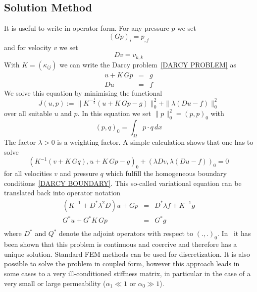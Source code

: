\subsection{Solution Method \label{DARCY SOLVE}}
It is useful to write  in operator form.
For any pressure $p$ we set
\begin{equation}
(Gp)_{i} =  p_{,j}
\end{equation}
and for velocity $v$ we set
\begin{equation}
Dv = v_{k,k}
\end{equation}
With $K=(\kappa_{ij})$ we can write the Darcy problem~\ref{DARCY PROBLEM} as
\begin{equation}
\begin{array}{rcl}
u + K \, Gp & = & g \\
Du & = & f 
\end{array}
\end{equation} 
We solve this equation by minimising the functional
\begin{equation}\label{DARCY COST}
J(u,p):=\|K^{-\frac{1}{2}}(u + K \, G p - g)\|^2_{0} +  \|\lambda (Du-f) \|_{0}^2 
\end{equation} 
over all suitable $u$ and $p$.
In this equation we set $\|p\|^2_{0}=(p,p)_{0}$ with
\begin{equation}
(p,q)_{0} = \int_{\Omega } p\cdot q \, dx
\end{equation} 
The factor $\lambda>0$ is a weighting factor.
A simple calculation shows that one has to solve
\begin{equation}
( K^{-1} (v + K \, Gq) , u +K \, G p - g)_{0} +  (\lambda Dv,\lambda (Du-f) )_{0} =0 
\end{equation} 
for all velocities $v$ and pressure $q$ which fulfill the homogeneous boundary
conditions~\ref{DARCY BOUNDARY}.
This so-called variational equation can be translated back into operator notation
\begin{equation}
\begin{array}{rcl}
(K^{-1}+ D^*\lambda^2 D)u + Gp & = &  D^*\lambda f + K^{-1} g \\
G^*u  + G^*K \, G p & = & G^*g \\ 
\end{array}
\end{equation} 
where $D^*$ and $Q^*$ denote the adjoint operators with respect to $(.,.)_{0}$.
In~\cite{LEASTSQUARESFEM1994} it has been shown that this problem is
continuous and coercive and therefore has a unique solution.
Standard FEM methods can be used for discretization. It is also possible to
solve the problem in coupled form, however this approach leads in some cases
to a very ill-conditioned stiffness matrix, in particular in the case of a
very small or large permeability ($\alpha_{1} \ll 1$ or $\alpha_{0} \gg 1$).

